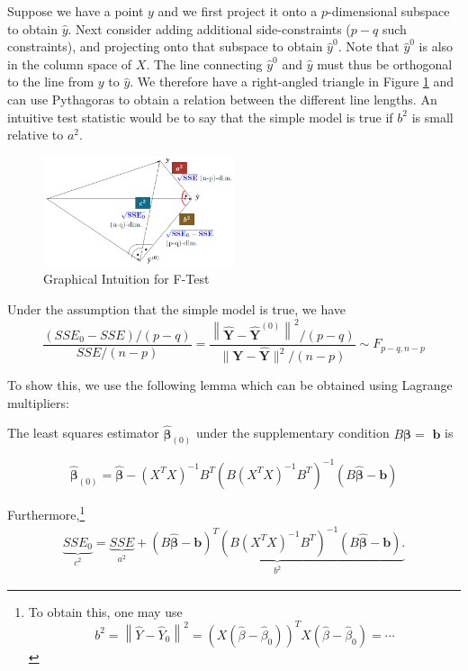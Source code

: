 \documentclass[11pt, %
	oneside, %
	english, %
	onehalfspacing, %
	]{article} %
\numberwithin{equation}{section}
\begin{document}
Suppose we have a point $y$ and we first project it onto a $p$-dimensional subspace to obtain $\hat{y}$. Next consider adding additional side-constraints ($p-q$ such constraints), and projecting onto that subspace to obtain $\hat{y}^0$. Note that $\hat{y}^0$ is also in the column space of $X$. The line connecting $\hat{y}^0$ and $\hat{y}$ must thus be orthogonal to the line from $y$ to $\hat{y}$. We therefore have a right-angled triangle in Figure \ref{fig:f_test_int} and can use Pythagoras to obtain a relation between the different line lengths. An intuitive test statistic would be to say that the simple model is true if $b^2$ is small relative to $a^2$.

\begin{figure}
    \caption{Graphical Intuition for F-Test}
    \label{fig:f_test_int}
    \begin{center}
        \includegraphics[width = 0.5\textwidth]{f_test_fig.png}
    \end{center}
\end{figure}

Under the assumption that the simple model is true, we have
\begin{equation*}
    \frac{\left(S S E_0-S S E\right) /(p-q)}{S S E /(n-p)}=\frac{\left\|\hat{\mathbf{Y}}-\widehat{\mathbf{Y}}^{(0)}\right\|^2 /(p-q)}{\|\mathbf{Y}-\widehat{\mathbf{Y}}\|^2 /(n-p)} \sim F_{p-q, n-p}
\end{equation*}

To show this, we use the following lemma which can be obtained using Lagrange multipliers:

\begin{lemma}{}{}
    The least squares estimator $\widehat{\mathbf{\beta}}_{(0)}$ under the supplementary condition $B \mathbf{\beta}=$ $\mathbf{b}$ is

    $$
    \widehat{\mathbf{\beta}}_{(0)}=\widehat{\mathbf{\beta}}-\left(X^T X\right)^{-1} B^T\left(B\left(X^T X\right)^{-1} B^T\right)^{-1}(B \widehat{\mathbf{\beta}}-\mathbf{b})
    $$

Furthermore,\footnote{To obtain this, one may use
$$
b^2=\left\|\hat{Y}-\hat{Y}_0\right\|^2=\left(X\left(\hat{\beta}-\hat{\beta}_0\right)\right)^T X\left(\hat{\beta}-\hat{\beta}_0\right)=\cdots
$$}
$$
\begin{gathered}
\underbrace{S S E_0}_{c^2}=\underbrace{S S E}_{a^2} + \underbrace{(B \widehat{\mathbf{\beta}}-\mathbf{b})^T\left(B\left(X^T X\right)^{-1} B^T\right)^{-1}(B \widehat{\mathbf{\beta}}-\mathbf{b}) .}_{b^2}
\end{gathered}
$$
\end{lemma}
\end{document}
